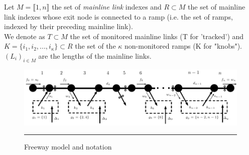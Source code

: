 Let $M=\llbracket 1,n \rrbracket$ the set of \emph{mainline link} indexes and $R\subset{M}$ the set of mainline link indexes whose exit node is connected to a ramp (i.e. the set of ramps, indexed by their preceding mainline link). \\
We denote as $T\subset{M}$ the set of monitored mainline links  (T for 'tracked') and $K=\{ i_{1},i_{2},...,i_{\kappa}\}\subset{R}$ the set of the $\kappa$ non-monitored ramps (K for "knobs").\\
$(L_{i})_{i\in M}$ are the lengths of the mainline links.\\
\begin{figure}[t]
	\centering
	\includegraphics[width=7in]{figures/scheme.pdf}
%
	\rule{7in}{0.3pt}
	\caption{Freeway model and notation}
	\label{fig:scheme}
\end{figure}
